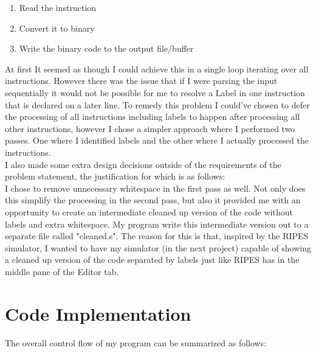 \documentclass[12pt]{article}
\begin{document}
    \begin{enumerate}
		\item{Read the instruction}
		\item{Convert it to binary}
		\item{Write the binary code to the output file/buffer}
	\end{enumerate}

    At first It seemed as though I could achieve this in a single loop iterating over all instructions. However there was the issue that if I were parsing the input sequentially it would not be possible for me to resolve a Label in one instruction that is declared on a later line. To remedy this problem I could've chosen to defer the processing of all instructions including labels to happen after processing all other instructions, however I chose a simpler approach where I performed two passes. One where I identified labels and the other where I actually processed the instructions.
    \\

    I also made some extra design decisions outside of the requirements of the problem statement, the justification for which is as follows:
    \\

    I chose to remove unnecessary whitespace in the first pass as well. Not only does this simplify the processing in the second pass, but also it provided me with an opportunity to create an intermediate cleaned up version of the code without labels and extra whitespace. My program write this intermediate version out to a separate file called "cleaned.s". The reason for this is that, inspired by the RIPES simulator, I wanted to have my simulator (in the next project) capable of showing a cleaned up version of the code separated by labels just like RIPES has in the middle pane of the Editor tab.

    \section{Code Implementation}

    The overall control flow of my program can be summarized as follows:
    \\\\
\end{document}
